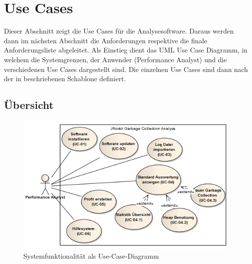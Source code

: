 \section{Use Cases}\label{use_cases}
Dieser Abschnitt zeigt die Use Cases für die Analysesoftware. Daraus werden dann im nächsten Abschnitt die Anforderungen respektive die finale Anforderungsliste abgeleitet. Als Einstieg dient das UML Use Case Diagramm, in welchem die Systemgrenzen, der Anwender (Performance Analyst) und die verschiedenen Use Cases dargestellt sind. Die einzelnen Use Cases sind dann nach der in \cite[S. 78-79]{pohl2010basiswissen} beschriebenen Schablone definiert.
\subsection{Übersicht}\label{systemfunktionalitaet}
 \begin{figure}[H]
  	\centering
    	\includegraphics[width=14cm]{images/anforderungen_use-case}
        	\caption{Systemfunktionalität als Use-Case-Diagramm}
\end{figure}
